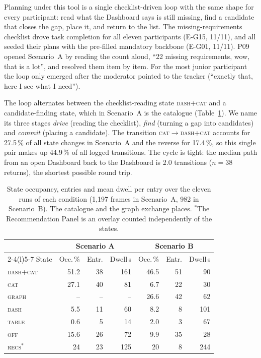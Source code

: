 \documentclass[a4paper,twoside]{article}
\newcommand{\st}[1]{\textsc{#1}}
\begin{document}
Planning under this tool is a single checklist-driven loop with the same shape for every participant: read what the Dashboard says is still missing, find a candidate that closes the gap, place it, and return to the list. The missing-requirements checklist drove task completion for all eleven participants (E-G15, 11/11), and all seeded their plans with the pre-filled mandatory backbone (E-G01, 11/11). P09 opened Scenario~A by reading the count aloud, ``22 missing requirements, wow, that is a lot'', and resolved them item by item. For the most junior participant the loop only emerged after the moderator pointed to the tracker (``exactly that, here I see what I need'').

The loop alternates between the checklist-reading state \st{dash+cat} and a candidate-finding state, which in Scenario~A is the catalogue (Table~\ref{tab:occupancy}). We name its three stages \emph{drive} (reading the checklist), \emph{find} (turning a gap into candidates) and \emph{commit} (placing a candidate). The transition \st{cat}$\rightarrow$\st{dash+cat} accounts for 27.5\,\% of all state changes in Scenario~A and the reverse for 17.4\,\%, so this single pair makes up 44.9\,\% of all logged transitions. The cycle is tight: the median path from an open Dashboard back to the Dashboard is 2.0 transitions ($n=38$ returns), the shortest possible round trip.

\begin{table}[t]
\caption{State occupancy, entries and mean dwell per entry over the eleven runs of each condition (1,197 frames in Scenario~A, 982 in Scenario~B). The catalogue and the graph exchange places. $^{*}$The Recommendation Panel is an overlay counted independently of the states.}
\label{tab:occupancy}
\centering
\footnotesize
\setlength{\tabcolsep}{2.2pt}
\begin{tabular}{@{}lrrrrrr@{}}
\toprule
& \multicolumn{3}{c}{Scenario A} & \multicolumn{3}{c}{Scenario B} \\
\cmidrule(r){2-4}\cmidrule(l){5-7}
State & Occ.\,\% & Entr. & Dwell\,s & Occ.\,\% & Entr. & Dwell\,s \\
\midrule
\st{dash+cat} & 51.2 & 38 & 161 & 46.5 & 51 & 90 \\
\st{cat}      & 27.1 & 40 &  81 &  6.7 & 22 & 30 \\
\st{graph}    & --   & -- &  -- & 26.6 & 42 & 62 \\
\st{dash}     &  5.5 & 11 &  60 &  8.2 &  8 & 101 \\
\st{table}    &  0.6 &  5 &  14 &  2.0 &  3 & 67 \\
\st{off}      & 15.6 & 26 &  72 &  9.9 & 35 & 28 \\
\midrule
\st{recs}$^{*}$ & 24 & 23 & 125 & 20 & 8 & 244 \\
\bottomrule
\end{tabular}
\end{table}
\end{document}
